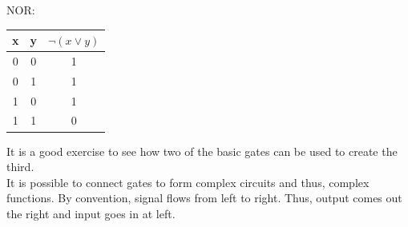 \documentclass[nobib]{tufte-handout}
\begin{document}
NOR:\\
\begin{table}
    \centering
       \begin{tabular}{c c|c}
       x&y&{$\lnot(x\lor y)$} \\
       \hline
       0&0&1\\
       0&1&1\\
       1&0&1\\
       1&1&0
       \end{tabular}
   \end{table}
It is a good exercise to see how two of the basic gates can be used to create the third.\\
It is possible to connect gates to form complex circuits and thus, complex functions. By convention, signal flows from left to right. Thus, output comes out the right and input goes in at left. 

\pagebreak
\end{document}
